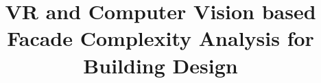 \documentclass[final,5p,times]{elsarticle}%
\begin{document}
\begin{frontmatter}

\title{VR and Computer Vision based Facade Complexity Analysis for Building Design}


\author[inst1]{~}

\affiliation[inst1]{~}

\affiliation[inst2]{~}

\affiliation[inst3]{~}

%
%

\begin{abstract}



\end{abstract}
\end{frontmatter}
\end{document}
